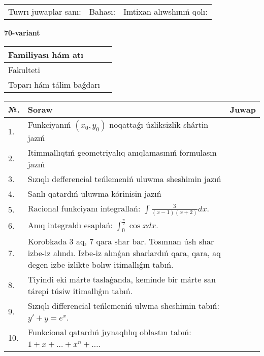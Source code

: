 \documentclass{article}
\begin{document}
\vspace{1cm}

\begin{tabular}{ c c c }
Tuwrı juwaplar sanı: \underline{\hspace{2cm}} & Bahası: \underline{\hspace{2cm}} & Imtixan alıwshınıń qolı: \underline{\hspace{2cm}} \\
\end{tabular}

\newpage

\begin{center}\textbf{70-variant}\end{center}

\bgroup
\def\arraystretch{1.5}
\begin{tabular}{ |m{6cm}|m{10cm}| }
  \hline
  Familiyası hám atı & \\
  \hline
  Fakulteti &\\
  \hline
  Toparı hám tálim baǵdarı & \\
  \hline
\end{tabular}
\egroup

\vspace{0.5cm}

\bgroup
\def\arraystretch{2}
\begin{tabular}{ |l|m{8cm}|m{7cm}| }
  \hline
  №. & Soraw & Juwap \\
  \hline
  1. & Funkciyanıń $(x_{0}, y_{0})$ noqattaǵı úzliksizlik shártin jazıń &  \\
  \hline
  2. & Itimmallıqtıń geometriyalıq anıqlamasınıń formulasın jazıń &  \\
  \hline
  3. & Sızıqlı defferencial teńlemeniń uluwma sheshimin jazıń &  \\
  \hline
  4. & Sanlı qatardıń uluwma kórinisin jazıń &  \\
  \hline
  5. & Racional funkciyanı integrallań: $\displaystyle\int {\frac{3}{(x - 1)(x + 2)}dx}$. &  \\
  \hline
  6. & Anıq integraldı esaplań: $\displaystyle\int_{0}^{\frac{\pi}{2}}\cos xdx$. &  \\
  \hline
  7. & Korobkada 3 aq, 7 qara shar bar. Tosınnan úsh shar izbe-iz alındı. Izbe-iz alınǵan sharlardıń qara, qara, aq degen izbe-izlikte bolıw itimallıǵın tabıń. &  \\
  \hline
  8. & Tiyindi eki márte taslaǵanda, keminde bir márte san tárepi túsiw itimallıǵın tabıń. &  \\
  \hline
  9. & Sızıqlı differencial teńlemeniń ulwma sheshimin tabıń: $y' + y =e^{x}$. &  \\
  \hline
  10. & Funkcional qatardıń jıynaqlılıq oblastın tabıń: $1 + x + \ldots + x^{n} + \ldots$. &  \\
  \hline
\end{tabular}
\egroup
\end{document}
